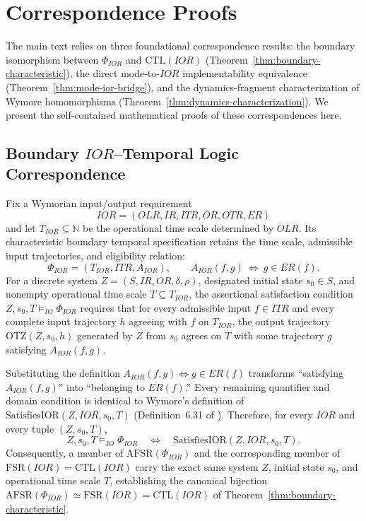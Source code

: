 \section{Correspondence Proofs}
\label{app:hom-biimp}

The main text relies on three foundational correspondence results: the boundary isomorphism between $\Phi_{IOR}$ and $\mathrm{CTL}(IOR)$ (Theorem~\ref{thm:boundary-characteristic}), the direct mode-to-$IOR$ implementability equivalence (Theorem~\ref{thm:mode-ior-bridge}), and the dynamics-fragment characterization of Wymore homomorphisms (Theorem~\ref{thm:dynamics-characterization}). We present the self-contained mathematical proofs of these correspondences here.

\subsection{Boundary \texorpdfstring{$IOR$}{IOR}--Temporal Logic Correspondence}

Fix a Wymorian input/output requirement
\[
  IOR=(OLR,IR,ITR,OR,OTR,ER)
\]
and let $T_{IOR}\subseteq\mathbb{N}$ be the operational time scale determined by $OLR$. Its characteristic boundary temporal specification retains the time scale, admissible input trajectories, and eligibility relation:
\[
  \Phi_{IOR}=(T_{IOR},ITR,A_{IOR}),
  \qquad A_{IOR}(f,g)\ \Longleftrightarrow\ g\in ER(f).
\]
For a discrete system $Z=(S,IR,OR,\delta,\rho)$, designated initial state $s_0\in S$, and nonempty operational time scale $T\subseteq T_{IOR}$, the assertional satisfaction condition $Z,s_0,T\models_{IO}\Phi_{IOR}$ requires that for every admissible input $f\in ITR$ and every complete input trajectory $h$ agreeing with $f$ on $T_{IOR}$, the output trajectory $\mathrm{OTZ}(Z,s_0,h)$ generated by $Z$ from $s_0$ agrees on $T$ with some trajectory $g$ satisfying $A_{IOR}(f,g)$.

Substituting the definition $A_{IOR}(f,g)\Longleftrightarrow g\in ER(f)$ transforms ``satisfying $A_{IOR}(f,g)$'' into ``belonging to $ER(f)$.'' Every remaining quantifier and domain condition is identical to Wymore's definition of $\mathrm{SatisfiesIOR}(Z,IOR,s_0,T)$ (Definition~6.31 of \citet{Wymore1993}). Therefore, for every $IOR$ and every tuple $(Z,s_0,T)$,
\[
  Z,s_0,T\models_{IO}\Phi_{IOR}
  \quad\Longleftrightarrow\quad
  \mathrm{SatisfiesIOR}(Z,IOR,s_0,T).
\]
Consequently, a member of $\mathrm{AFSR}(\Phi_{IOR})$ and the corresponding member of $\mathrm{FSR}(IOR)=\mathrm{CTL}(IOR)$ carry the exact same system $Z$, initial state $s_0$, and operational time scale $T$, establishing the canonical bijection $\mathrm{AFSR}(\Phi_{IOR})\simeq\mathrm{FSR}(IOR)=\mathrm{CTL}(IOR)$ of Theorem~\ref{thm:boundary-characteristic}.

